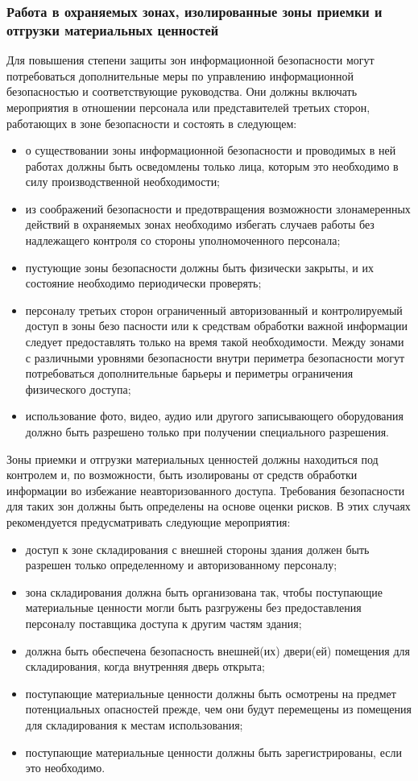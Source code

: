 \documentclass[12pt, russian, oneside, article]{ncc}
\begin{document}
\subsubsection{Работа в охраняемых зонах, изолированные зоны приемки и отгрузки материальных ценностей}
\label{sec-5_5_3}


Для повышения степени защиты зон информационной безопасности могут потребоваться дополнительные меры по управлению информационной безопасностью и соответствующие руководства. Они должны включать мероприятия в отношении персонала или представителей третьих сторон, работающих в зоне безопасности и состоять в следующем:
\begin{itemize}
\item о существовании зоны информационной безопасности и проводимых в ней работах должны быть осведомлены только лица, которым это необходимо в силу производственной необходимости;
\item из соображений безопасности и предотвращения возможности злонамеренных действий в охраняемых зонах необходимо избегать случаев работы без надлежащего контроля со стороны уполномоченного персонала;
\item пустующие зоны безопасности должны быть физически закрыты, и их состояние необходимо периодически проверять;
\item персоналу третьих сторон ограниченный авторизованный и контролируемый доступ в зоны безо пасности или к средствам обработки важной информации следует предоставлять только на время такой необходимости. Между зонами с различными уровнями безопасности внутри периметра безопасности могут потребоваться дополнительные барьеры и периметры ограничения физического доступа;
\item использование фото, видео, аудио или другого записывающего оборудования должно быть разрешено только при получении специального разрешения.
\end{itemize}

Зоны приемки и отгрузки материальных ценностей должны находиться под контролем и, по возможности, быть изолированы от средств обработки информации во избежание неавторизованного доступа. Требования безопасности для таких зон должны быть определены на основе оценки рисков. В этих случаях рекомендуется предусматривать следующие мероприятия:
\begin{itemize}
\item доступ к зоне складирования с внешней стороны здания должен быть разрешен только определенному и авторизованному персоналу;
\item зона складирования должна быть организована так, чтобы поступающие материальные ценности могли быть разгружены без предоставления персоналу поставщика доступа к другим частям здания;
\item должна быть обеспечена безопасность внешней(их) двери(ей) помещения для складирования, когда внутренняя дверь открыта;
\item поступающие материальные ценности должны быть осмотрены на предмет потенциальных опасностей прежде, чем они будут перемещены из помещения для складирования к местам использования;
\item поступающие материальные ценности должны быть зарегистрированы, если это необходимо.
\end{itemize}
\end{document}
